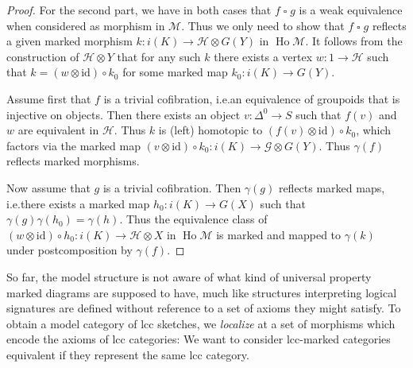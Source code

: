\documentclass[a4paper]{article}
\theoremstyle{remark}
\theoremstyle{definition}
\begin{document}
\begin{proof}
  For the second part, we have in both cases that $f \mathbin{\square} g$ is a weak equivalence when considered as morphism in $\mathcal{M}$.
  Thus we only need to show that $f \mathbin{\square} g$ reflects a given marked morphism $k : i(K) \rightarrow \mathcal{H} \otimes G(Y)$ in $\operatorname{Ho} \mathcal{M}$.
  It follows from the construction of $\mathcal{H} \otimes Y$ that for any such $k$ there exists a vertex $w : 1 \rightarrow \mathcal{H}$ such that $k = (w \otimes \mathrm{id}) \circ k_0$ for some marked map $k_0 : i(K) \rightarrow G(Y)$.

  Assume first that $f$ is a trivial cofibration, i.e.\@ an equivalence of groupoids that is injective on objects.
  Then there exists an object $v : \Delta^0 \rightarrow S$ such that $f(v)$ and $w$ are equivalent in $\mathcal{H}$.
  Thus $k$ is (left) homotopic to $(f(v) \otimes \mathrm{id}) \circ k_0$, which factors via the marked map $(v \otimes \mathrm{id}) \circ k_0 : i(K) \rightarrow \mathcal{G} \otimes G(Y)$.
  Thus $\gamma(f)$ reflects marked morphisms.

  Now assume that $g$ is a trivial cofibration.
  Then $\gamma(g)$ reflects marked maps, i.e.\@ there exists a marked map $h_0 : i(K) \rightarrow G(X)$ such that $\gamma(g)\gamma(h_0) = \gamma(h)$.
  Thus the equivalence class of $(w \otimes \mathrm{id}) \circ h_0 : i(K) \rightarrow \mathcal{H} \otimes X$ in $\operatorname{Ho} \mathcal{M}$ is marked and mapped to $\gamma(k)$ under postcomposition by $\gamma(f)$.
\end{proof}

So far, the model structure is not aware of what kind of universal property marked diagrams are supposed to have, much like structures interpreting logical signatures are defined without reference to a set of axioms they might satisfy.
To obtain a model category of lcc sketches, we \emph{localize} at a set of morphisms which encode the axioms of lcc categories:
We want to consider lcc-marked categories equivalent if they represent the same lcc category.
\end{document}
